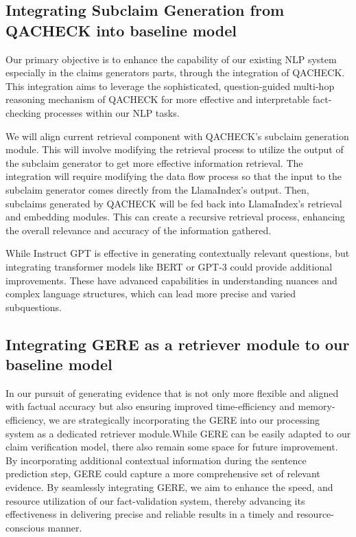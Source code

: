 \documentclass{article}
\begin{document}
\subsection{Integrating Subclaim Generation from QACHECK into baseline model}
Our primary objective is to enhance the capability of our existing NLP system especially in the claims generators parts, through the integration of QACHECK. This integration aims to leverage the sophisticated, question-guided multi-hop reasoning mechanism of QACHECK for more effective and interpretable fact-checking processes within our NLP tasks.\par
We will align current retrieval component with QACHECK’s subclaim generation module. This will involve modifying the retrieval process to utilize the output of the subclaim generator to get more effective information retrieval. The integration will require modifying the data flow process so that the input to the subclaim generator comes directly from the LlamaIndex’s output. Then, subclaims generated by QACHECK will be fed back into LlamaIndex’s retrieval and embedding modules. This can create a recursive retrieval process, enhancing the overall relevance and accuracy of the information gathered. \par
While Instruct GPT is effective in generating contextually relevant questions,  but integrating transformer models like BERT or GPT-3 could provide additional improvements. These have advanced capabilities in understanding nuances and complex language structures, which can lead more precise and varied subquestions.

\subsection{Integrating GERE as a retriever module to our baseline model}
In our pursuit of generating evidence that is not only more flexible and aligned with factual accuracy but also ensuring improved time-efficiency and memory-efficiency, we are strategically incorporating the GERE into our processing system as a dedicated retriever module.While GERE can be easily adapted to our claim verification model, there also remain some space for future improvement. By incorporating additional contextual information during the sentence prediction step, GERE could capture a more comprehensive set of relevant evidence. By seamlessly integrating GERE, we aim to enhance the speed, and resource utilization of our fact-validation system, thereby advancing its effectiveness in delivering precise and reliable results in a timely and resource-conscious manner.\par
\end{document}
